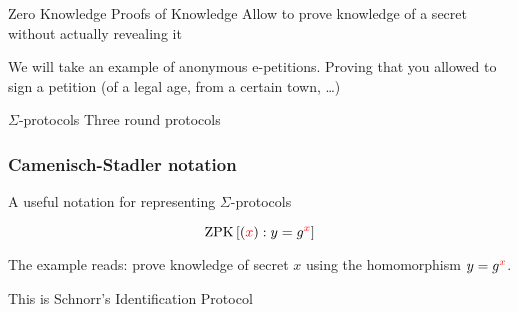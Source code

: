 \documentclass{beamer}
\begin{document}
\begin{frame}{Zero Knowledge Proofs of Knowledge}
  Allow to prove knowledge of a secret without actually revealing it

  \vfill

  \pause

  We will take an example of anonymous e-petitions. Proving
  that you allowed to sign a petition (of a legal age, from
  a certain town, \ldots)
\end{frame}

\begin{frame}[fragile]{$\Sigma$-protocols}
  Three round protocols

\end{frame}

\begin{frame}
  \frametitle{Camenisch-Stadler notation}
  
  A useful notation for representing $\Sigma$-protocols

  \[
  \textrm{ZPK}\left[ (\textcolor{red}{x}): y = g^{\textcolor{red}{x}} \right]
  \]

  The example reads: prove knowledge of secret $x$ using the
  homomorphism $y = g^{\textcolor{red}{x}}$.

  This is Schnorr's Identification Protocol
\end{frame}
\end{document}
